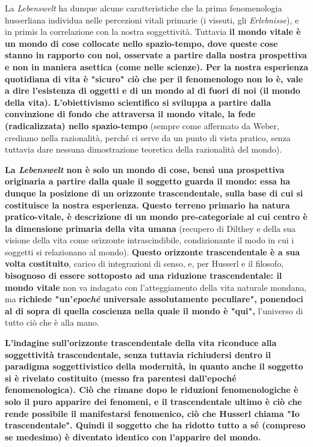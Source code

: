 La \textit{Lebenswelt} ha dunque alcune caratteristiche che
la prima fenomenologia husserliana individua nelle percezioni
vitali primarie (i vissuti, gli \textit{Erlebnisse}), e in primis
la correlazione con la nostra soggettività. Tuttavia
\textbf{il mondo vitale è un mondo di cose collocate
nello spazio-tempo, dove queste cose stanno in
rapporto con noi, osservate a partire dalla nostra
prospettiva e non in maniera asettica (come nelle
scienze).
Per la nostra esperienza quotidiana di vita è
"sicuro" ciò che per il fenomenologo non lo è, vale
a dire l'esistenza di oggetti e di un mondo
al di fuori di noi (il mondo della vita). L'obiettivismo scientifico
si sviluppa a partire dalla convinzione di fondo
che attraversa il mondo vitale, la fede (radicalizzata) nello
spazio-tempo} (sempre come affermato da Weber, crediamo nella razionalità,  perché ci serve da un punto di vista pratico, senza tuttavia dare nessuna dimostrazione teoretica della razionalità del mondo).

 \textbf{La \textit{Lebenswelt} non è solo un mondo
di cose, bensì una prospettiva originaria a partire
dalla quale il soggetto guarda il mondo: essa
ha dunque la posizione di un orizzonte trascendentale,
sulla base di cui si costituisce la nostra esperienza.
Questo terreno primario ha natura pratico-vitale,
è descrizione di un mondo pre-categoriale al cui
centro è la dimensione primaria della vita umana}
(recupero di Dilthey e della sua visione della vita
come orizzonte intrascindibile, condizionante il
modo in cui i soggetti si relazionano al mondo).
\textbf{Questo orizzonte trascendentale è a sua volta
costituito}, carico di integrazioni di senso, e,
per Husserl e il filosofo, \textbf{bisognoso di essere sottoposto ad
una riduzione trascendentale: il mondo vitale}
non va indagato con l'atteggiamento della vita
naturale mondana, ma \textbf{richiede "un'\textit{epoché} universale
assolutamente peculiare", ponendoci al di sopra di
quella coscienza nella quale il mondo è "qui",}
l'universo di tutto ciò che è alla mano.

\textbf{L'indagine sull'orizzonte trascendentale della
vita riconduce alla soggettività trascendentale,
senza tuttavia richiudersi dentro il
paradigma soggettivistico della modernità, in
quanto anche il soggetto si è rivelato costituito
(messo fra parentesi dall'epoché fenomenologica).
Ciò che rimane dopo le riduzioni fenomenologiche è
solo il puro apparire dei fenomeni, e\textit{} il trascendentale
ultimo è ciò che rende possibile il manifestarsi
fenomenico, ciò che Husserl chiama "Io
trascendentale". Quindi il soggetto che ha ridotto
tutto a sé (compreso se medesimo) è diventato
identico con l'apparire del mondo.}

